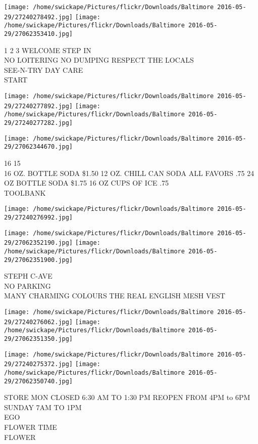 \documentclass[10pt,letterpaper]{article}
\begin{document}
\texttt{[image: /home/swickape/Pictures/flickr/Downloads/Baltimore 2016-05-29/27240278492.jpg]}
\texttt{[image: /home/swickape/Pictures/flickr/Downloads/Baltimore 2016-05-29/27062353410.jpg]}

1 2 3 WELCOME STEP IN\\
NO LOITERING NO DUMPING RESPECT THE LOCALS\\
SEE{-}N{-}TRY DAY CARE\\
START
\pagebreak

\texttt{[image: /home/swickape/Pictures/flickr/Downloads/Baltimore 2016-05-29/27240277892.jpg]}
\texttt{[image: /home/swickape/Pictures/flickr/Downloads/Baltimore 2016-05-29/27240277282.jpg]}

\texttt{[image: /home/swickape/Pictures/flickr/Downloads/Baltimore 2016-05-29/27062344670.jpg]}

16 15\\
16 OZ. BOTTLE SODA \$1.50 12 OZ. CHILL CAN SODA ALL FAVORS .75 24 OZ BOTTLE SODA \$1.75 16 OZ CUPS OF ICE .75\\
TOOLBANK
\pagebreak

\texttt{[image: /home/swickape/Pictures/flickr/Downloads/Baltimore 2016-05-29/27240276992.jpg]}

\vspace{0.25in}
\texttt{[image: /home/swickape/Pictures/flickr/Downloads/Baltimore 2016-05-29/27062352190.jpg]}
\texttt{[image: /home/swickape/Pictures/flickr/Downloads/Baltimore 2016-05-29/27062351900.jpg]}

STEPH C{-}AVE\\
NO PARKING\\
MANY CHARMING COLOURS THE REAL ENGLISH MESH VEST
\pagebreak

\texttt{[image: /home/swickape/Pictures/flickr/Downloads/Baltimore 2016-05-29/27240276062.jpg]}
\texttt{[image: /home/swickape/Pictures/flickr/Downloads/Baltimore 2016-05-29/27062351350.jpg]}

\texttt{[image: /home/swickape/Pictures/flickr/Downloads/Baltimore 2016-05-29/27240275372.jpg]}
\texttt{[image: /home/swickape/Pictures/flickr/Downloads/Baltimore 2016-05-29/27062350740.jpg]}

STORE MON CLOSED 6:30 AM TO 1:30 PM REOPEN FROM 4PM to 6PM SUNDAY 7AM TO 1PM\\
EGO\\
FLOWER TIME\\
FLOWER
\pagebreak
\end{document}

